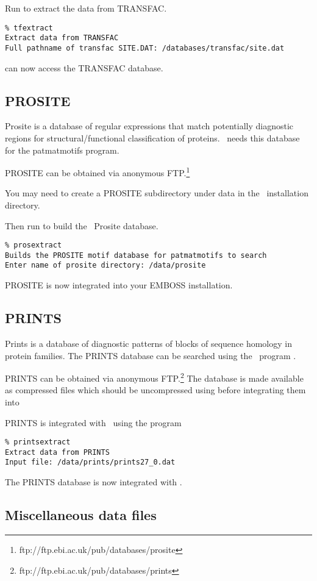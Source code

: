 \documentclass{report}
\begin{document}
Run  to extract the data from TRANSFAC.
\begin{verbatim}
% tfextract
Extract data from TRANSFAC
Full pathname of transfac SITE.DAT: /databases/transfac/site.dat
\end{verbatim}
 can now access the TRANSFAC database.

      \subsection{PROSITE}
Prosite is a database of regular expressions that match potentially diagnostic regions for structural/functional classification of proteins. \EMBOSS\ needs this database for the patmatmotifs program.

PROSITE can be obtained via anonymous FTP.\footnote{ftp://ftp.ebi.ac.uk/pub/databases/prosite} 

You may need to create a PROSITE subdirectory under data in the \EMBOSS\ installation directory. 

Then run  to build the \EMBOSS\ Prosite database.
\begin{verbatim}
% prosextract
Builds the PROSITE motif database for patmatmotifs to search
Enter name of prosite directory: /data/prosite
\end{verbatim}
PROSITE is now integrated into your EMBOSS installation.

      \subsection{PRINTS}

Prints is a database of diagnostic patterns of blocks of sequence homology in protein families. The PRINTS database can be searched using the \EMBOSS\ program .

PRINTS can be obtained via anonymous FTP.\footnote{ftp://ftp.ebi.ac.uk/pub/databases/prints} The database is made available as compressed files which should be uncompressed using  before integrating them into \EMBOSS\

PRINTS is integrated with \EMBOSS\ using the program 
\begin{verbatim}
% printsextract
Extract data from PRINTS
Input file: /data/prints/prints27_0.dat
\end{verbatim}
The PRINTS database is now integrated with \EMBOSS.

\subsection{Miscellaneous data files}
\end{document}
